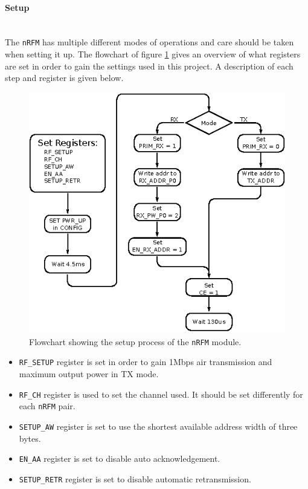 \paragraph{Setup} %
\label{par:nrfsetup}
~\\
The \texttt{nRFM} has multiple different modes of operations and care should be taken when setting it up.
The flowchart of figure \ref{fig:nrf_setup} gives an overview of what registers are set in order to gain the settings used in this project.
A description of each step and register is given below.
\begin{figure}[h]
	\centering
	\includegraphics[width=.8\linewidth]{graphics/nfr_setup}
	\caption{Flowchart showing the setup process of the \texttt{nRFM} module.}
	\label{fig:nrf_setup}
\end{figure}
\begin{itemize}
	\item \texttt{RF\_SETUP} register is set in order to gain 1Mbps air transmission and maximum output power in TX mode.
	\item \texttt{RF\_CH} register is used to set the channel used. It should be set differently for each \texttt{nRFM} pair.
	\item \texttt{SETUP\_AW} register is set to use the shortest available address width of three bytes.
	\item \texttt{EN\_AA} register is set to disable auto acknowledgement.
	\item \texttt{SETUP\_RETR} register is set to disable automatic retransmission.
\end{itemize}

